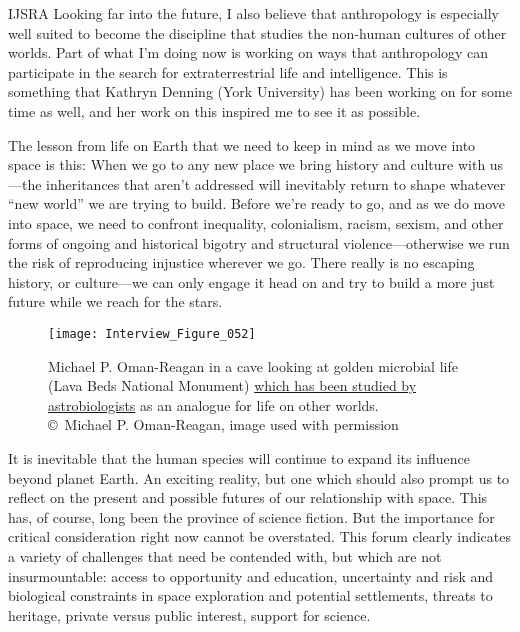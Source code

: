 \begin{labeling}{IJSRA}
	Looking far into the future, I also believe that anthropology is especially well suited to become the discipline that studies the non-human cultures of other worlds. Part of what I’m doing now is working on ways that anthropology can participate in the search for extraterrestrial life and intelligence. This is something that Kathryn Denning (York University) has been working on for some time as well, and her work on this inspired me to see it as possible.

	The lesson from life on Earth that we need to keep in mind as we move into space is this: When we go to any new place we bring history and culture with us—the inheritances that aren't addressed will inevitably return to shape whatever “new world” we are trying to build. Before we’re ready to go, and as we do move into space, we need to confront inequality, colonialism, racism, sexism, and other forms of ongoing and historical bigotry and structural violence—otherwise we run the risk of reproducing injustice wherever we go. There really is no escaping history, or culture—we can only engage it head on and try to build a more just future while we reach for the stars.

\begin{figure}[!htb]
	\texttt{[image: Interview\_Figure\_052]}
	\centering
	\caption{Michael P. Oman-Reagan in a cave looking at golden microbial life (Lava Beds National Monument) \href{<https://www.smithsonianmag.com/travel/how-bacteria-make-underground-cave-shine-gold-and-why-nasa-wants-study-them-180955670/>}{which has been studied by astrobiologists} as an analogue for life on other worlds.
		{\normalfont\scriptsize \\ \copyright\ Michael P. Oman-Reagan, image used with permission
	}}
	\label{Interview_Figure_052}
\end{figure}

\end{labeling}

\IJSRAseparator


It is inevitable that the human species will continue to expand its influence beyond planet Earth. An exciting reality, but one which should also prompt us to reflect on the present and possible futures of our relationship with space. This has, of course, long been the province of science fiction. But the importance for critical consideration right now cannot be overstated. This forum clearly indicates a variety of challenges that need be contended with, but which are not insurmountable: access to opportunity and education, uncertainty and risk and biological constraints in space exploration and potential settlements, threats to heritage, private versus public interest, support for science.

